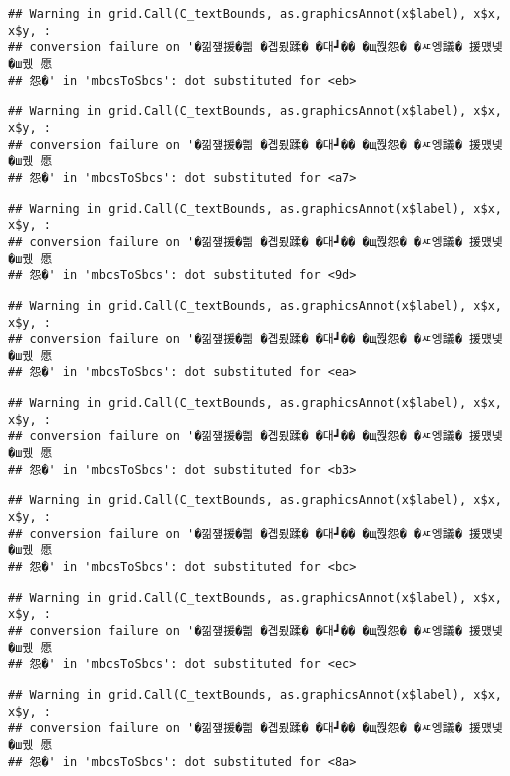 \documentclass[
]{article}
\begin{document}
\begin{verbatim}
## Warning in grid.Call(C_textBounds, as.graphicsAnnot(x$label), x$x, x$y, :
## conversion failure on '�낆쟾援�쁾 �곕룄蹂� �대┛�� �щ쭩怨� �ㅼ엥議� 援먰넻�ш퀬 愿
## 怨�' in 'mbcsToSbcs': dot substituted for <eb>
\end{verbatim}

\begin{verbatim}
## Warning in grid.Call(C_textBounds, as.graphicsAnnot(x$label), x$x, x$y, :
## conversion failure on '�낆쟾援�쁾 �곕룄蹂� �대┛�� �щ쭩怨� �ㅼ엥議� 援먰넻�ш퀬 愿
## 怨�' in 'mbcsToSbcs': dot substituted for <a7>
\end{verbatim}

\begin{verbatim}
## Warning in grid.Call(C_textBounds, as.graphicsAnnot(x$label), x$x, x$y, :
## conversion failure on '�낆쟾援�쁾 �곕룄蹂� �대┛�� �щ쭩怨� �ㅼ엥議� 援먰넻�ш퀬 愿
## 怨�' in 'mbcsToSbcs': dot substituted for <9d>
\end{verbatim}

\begin{verbatim}
## Warning in grid.Call(C_textBounds, as.graphicsAnnot(x$label), x$x, x$y, :
## conversion failure on '�낆쟾援�쁾 �곕룄蹂� �대┛�� �щ쭩怨� �ㅼ엥議� 援먰넻�ш퀬 愿
## 怨�' in 'mbcsToSbcs': dot substituted for <ea>
\end{verbatim}

\begin{verbatim}
## Warning in grid.Call(C_textBounds, as.graphicsAnnot(x$label), x$x, x$y, :
## conversion failure on '�낆쟾援�쁾 �곕룄蹂� �대┛�� �щ쭩怨� �ㅼ엥議� 援먰넻�ш퀬 愿
## 怨�' in 'mbcsToSbcs': dot substituted for <b3>
\end{verbatim}

\begin{verbatim}
## Warning in grid.Call(C_textBounds, as.graphicsAnnot(x$label), x$x, x$y, :
## conversion failure on '�낆쟾援�쁾 �곕룄蹂� �대┛�� �щ쭩怨� �ㅼ엥議� 援먰넻�ш퀬 愿
## 怨�' in 'mbcsToSbcs': dot substituted for <bc>
\end{verbatim}

\begin{verbatim}
## Warning in grid.Call(C_textBounds, as.graphicsAnnot(x$label), x$x, x$y, :
## conversion failure on '�낆쟾援�쁾 �곕룄蹂� �대┛�� �щ쭩怨� �ㅼ엥議� 援먰넻�ш퀬 愿
## 怨�' in 'mbcsToSbcs': dot substituted for <ec>
\end{verbatim}

\begin{verbatim}
## Warning in grid.Call(C_textBounds, as.graphicsAnnot(x$label), x$x, x$y, :
## conversion failure on '�낆쟾援�쁾 �곕룄蹂� �대┛�� �щ쭩怨� �ㅼ엥議� 援먰넻�ш퀬 愿
## 怨�' in 'mbcsToSbcs': dot substituted for <8a>
\end{verbatim}
\end{document}
